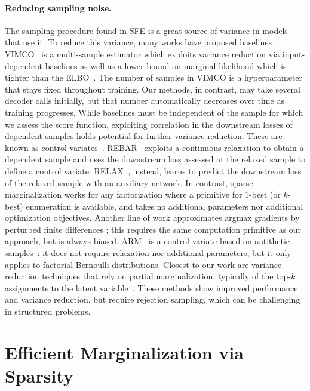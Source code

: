 \paragraph*{Reducing sampling noise.} The sampling procedure found in
SFE is a great source of variance in models that use it.
To reduce this variance, many works have proposed
baselines~\citep{Williams1992,MuProp,CV2013}. VIMCO~\citep{VIMCO} is
a multi-sample estimator which exploits variance reduction via
input-dependent baselines as well as a lower bound on marginal
likelihood which is tighter than the ELBO~\citep{IWAE}. The number of
samples in VIMCO is a hyperparameter that stays fixed throughout
training. Our methods, in contrast, may take several decoder calls
initially, but that number automatically decreases over time as
training progresses. While baselines must be independent of the
sample for which we assess the score function, exploiting correlation
in the downstream losses of dependent samples holds potential for
further variance reduction. These are known as control
variates~\citep{GreensmithEtAl}. REBAR~\citep{REBAR} exploits a
continuous relaxation to obtain a dependent sample and uses the
downstream loss assessed at the relaxed sample to define a control
variate. RELAX~\citep{RELAX}, instead, learns to predict the
downstream loss of the relaxed sample with an auxiliary network. In
contrast, sparse marginalization works for any factorization where a
primitive for $1$-best (or $k$-best) enumeration is available, and
takes no additional parameters nor additional optimization
objectives. Another line of work approximates argmax gradients by
perturbed finite differences \cite{lorberbom2019direct,vlastelica};
this requires the same computation primitive as our approach, but is
always biased. ARM~\citep{yin2019arm} is a control variate based on
antithetic samples~\citep{mcbook}: it does not require relaxation nor
additional parameters, but it only applies to factorial Bernoulli
distributions. Closest to our work are variance reduction techniques
that rely on partial marginalization, typically of the top-$k$
assignments to the latent variable~\citep{RB19,Kool2020Estimating}.
These methods show improved performance and variance reduction, but
require rejection sampling, which can be challenging in structured
problems.

\section{Efficient Marginalization via Sparsity}
\label{sec:categorical}


